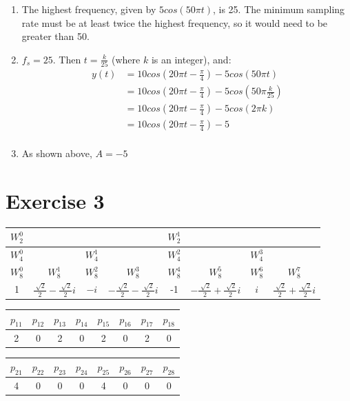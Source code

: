 \documentclass[12pt]{article}
\begin{document}
\begin{enumerate}[label=\alph*)]

\item The highest frequency, given by $5cos(50\pi t)$, is 25. The minimum sampling rate must be at least twice the highest frequency, so it would need to be greater than 50.

\item $f_s = 25$. Then $t = \frac{k}{25}$ (where $k$ is an integer), and:
\begin{align*}
y(t) &= 10cos(20\pi t - \frac{\pi}{4}) - 5cos(50\pi t)\\
&= 10cos(20\pi t - \frac{\pi}{4}) - 5cos(50\pi \frac{k}{25}) \\
&= 10cos(20\pi t - \frac{\pi}{4}) - 5cos(2\pi k) \\
&= 10cos(20\pi t - \frac{\pi}{4}) - 5 \\
\end{align*}

\item As shown above, $A = -5$

\end{enumerate}

\section*{Exercise 3}
\begin{tabular}{*{8}{| c }|}
\hline
$W_2^0$ & & & & $W_2^1$ & & & \\
\hline
$W_4^0$ & & $W_4^1$ & & $W_4^2$ & & $W_4^3$ & \\
\hline
$W_8^0$ & $W_8^1$ & $W_8^2$ & $W_8^3$ & $W_8^4$ & $W_8^5$ & $W_8^6$ & $W_8^7$ \\
 & $\frac{\sqrt[]{2}}{2} - \frac{\sqrt[]{2}}{2}i$ & $-i$ & $-\frac{\sqrt[]{2}}{2} - \frac{\sqrt[]{2}}{2}i$ & -1 & $-\frac{\sqrt[]{2}}{2} + \frac{\sqrt[]{2}}{2}i$ & $i$ & $\frac{\sqrt[]{2}}{2} + \frac{\sqrt[]{2}}{2}i$ \\
\hline
\end{tabular}


\begin{tabular}{*{8}{|c}|}
\hline
$p_{11}$ & $p_{12}$ & $p_{13}$ & $p_{14}$ & $p_{15}$ & $p_{16}$ & $p_{17}$ & $p_{18}$ \\
 & 0 & 2 & 0 & 2 & 0 & 2 & 0\\
\hline
\end{tabular}

\begin{tabular}{*{8}{|c}|}
\hline
$p_{21}$ & $p_{22}$ & $p_{23}$ & $p_{24}$ & $p_{25}$ & $p_{26}$ & $p_{27}$ & $p_{28}$ \\
 & 0 & 0 & 0 & 4 & 0 & 0 & 0\\
\hline
\end{tabular}
\end{document}
